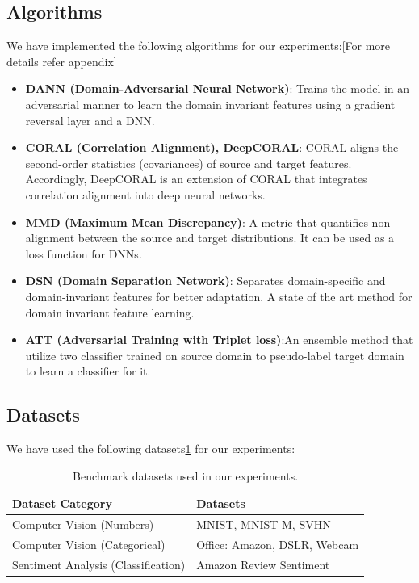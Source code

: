 \documentclass{article}
\begin{document}
\subsection{Algorithms}
We have implemented the following algorithms for our experiments:[For more details refer appendix]
\begin{itemize}
  \item \textbf{DANN (Domain-Adversarial Neural Network)}\cite{ganin2016domainadversarialtrainingneuralnetworks}: Trains the model in an adversarial manner to learn the domain invariant features using a gradient reversal layer and a DNN.
  \item \textbf{CORAL (Correlation Alignment), DeepCORAL}\cite{Coral,DeepCoral}: CORAL aligns the second-order statistics (covariances) of source and target features. Accordingly, DeepCORAL is an extension of CORAL that integrates correlation alignment into deep neural networks.
  \item \textbf{MMD (Maximum Mean Discrepancy)}\cite{sutherland2017generative}: A metric that quantifies non-alignment between the source and target distributions. It can be used as a loss function for DNNs.
  \item \textbf{DSN (Domain Separation Network)}\cite{DSN}: Separates domain-specific and domain-invariant features for better adaptation. A state of the art method for domain invariant feature learning.
  \item \textbf{ATT (Adversarial Training with Triplet loss)}\cite{pmlr-v70-saito17a}:An ensemble method that utilize two classifier trained on source domain to pseudo-label target domain to learn a classifier for it.
\end{itemize}

\subsection{Datasets}
We have used the following datasets\ref{tab:datasets} for our experiments:
\begin{table}
  \centering
  \caption{Benchmark datasets used in our experiments.}
  \label{tab:datasets}
  \begin{tabular}{ll}
      \toprule
      \textbf{Dataset Category} & \textbf{Datasets} \\
      \midrule
      Computer Vision (Numbers)     & MNIST, MNIST-M, SVHN \\
      Computer Vision (Categorical) & Office: Amazon, DSLR, Webcam \\
      Sentiment Analysis (Classification)  & Amazon Review Sentiment \\
      \bottomrule
  \end{tabular}
\end{table}
\end{document}
